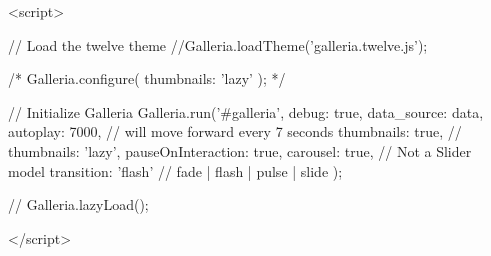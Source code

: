 \begin{rawhtml}
   <script>


    // Load the twelve theme
    //Galleria.loadTheme('galleria.twelve.js');

    /*
      Galleria.configure({
      thumbnails: 'lazy'
      });
    */
    

    // Initialize Galleria
    Galleria.run('#galleria', {
	debug: true,
	data_source: data,
	autoplay: 7000, // will move forward every 7 seconds
	thumbnails: true,  // thumbnails: 'lazy',
	pauseOnInteraction: true,
	carousel: true, // Not a Slider model
	transition: 'flash' // fade | flash | pulse | slide
    });

    // Galleria.lazyLoad();

    </script>
\end{rawhtml}
